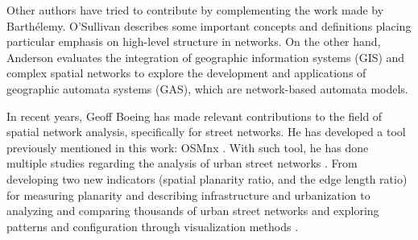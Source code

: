 Other authors have tried to contribute by complementing the work made by Barthélemy. O'Sullivan \cite{osullivan2014} describes some important concepts and definitions placing particular emphasis on high-level structure in networks. On the other hand, Anderson \cite{anderson_2020} evaluates the integration of geographic information systems (GIS) and complex spatial networks to explore the development and applications of geographic automata systems (GAS), which are network-based automata models.

In recent years, Geoff Boeing has made relevant contributions to the field of spatial network analysis, specifically for street networks. He has developed a tool previously mentioned in this work: OSMnx \cite{boeing_osmnx_2017}. With such tool, he has done multiple studies regarding the analysis of urban street networks \cite{Boeing2019-morphology}. From developing two new indicators (spatial planarity ratio, and the edge length ratio) for measuring planarity and describing infrastructure and urbanization \cite{boeing2020-planarity} to analyzing and comparing thousands of urban street networks \cite{boeing_multi-scale_2018}  and exploring patterns and configuration through visualization methods \cite{Boeing2020-urban-form-osm}.


